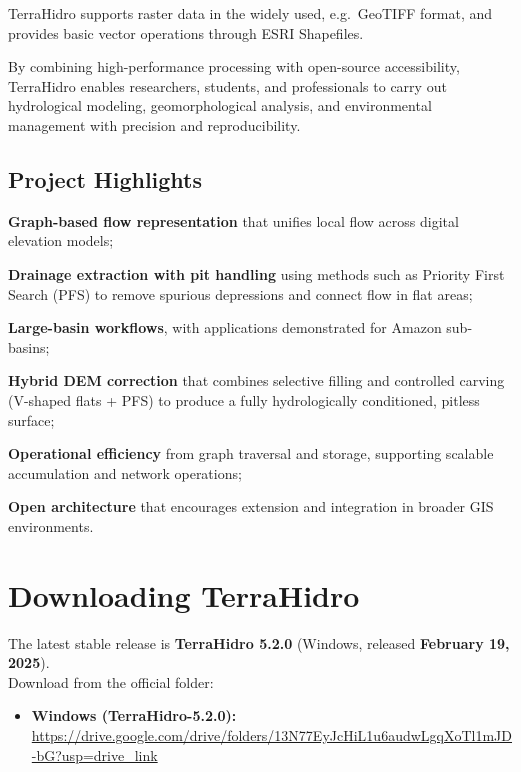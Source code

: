 \documentclass[
]{book}
\providecommand{\tightlist}{%
  \setlength{\itemsep}{0pt}\setlength{\parskip}{0pt}}
\begin{document}
TerraHidro supports raster data in the widely used, e.g.~GeoTIFF format, and provides basic vector operations through ESRI Shapefiles.

By combining high-performance processing with open-source accessibility, TerraHidro enables researchers, students, and professionals to carry out hydrological modeling, geomorphological analysis, and environmental management with precision and reproducibility.

\subsection*{Project Highlights}\label{project-highlights}

\textbf{Graph-based flow representation} that unifies local flow across digital elevation models;

\textbf{Drainage extraction with pit handling} using methods such as Priority First Search (PFS) to remove spurious depressions and connect flow in flat areas;

\textbf{Large-basin workflows}, with applications demonstrated for Amazon sub-basins;

\textbf{Hybrid DEM correction} that combines selective filling and controlled carving (V-shaped flats + PFS) to produce a fully hydrologically conditioned, pitless surface;

\textbf{Operational efficiency} from graph traversal and storage, supporting scalable accumulation and network operations;

\textbf{Open architecture} that encourages extension and integration in broader GIS environments.

\section*{Downloading TerraHidro}\label{downloading-terrahidro}

The latest stable release is \textbf{TerraHidro 5.2.0} (Windows, released \textbf{February 19, 2025}).\\
Download from the official folder:

\begin{itemize}
\tightlist
\item
  \textbf{Windows (TerraHidro-5.2.0):} \url{https://drive.google.com/drive/folders/13N77EyJcHiL1u6audwLgqXoTl1mJD-bG?usp=drive_link}
\end{itemize}
\end{document}
